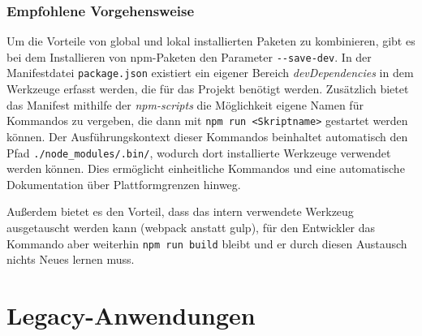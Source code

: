 \subsubsection{Empfohlene Vorgehensweise}
Um die Vorteile von global und lokal installierten Paketen zu kombinieren, gibt es bei dem Installieren von npm-Paketen den Parameter \verb|--save-dev|.
In der Manifestdatei \verb|package.json| existiert ein eigener Bereich \emph{devDependencies} in dem Werkzeuge erfasst werden, die für das Projekt benötigt werden.
Zusätzlich bietet das Manifest mithilfe der \emph{npm-scripts} die Möglichkeit eigene Namen für Kommandos zu vergeben, die dann mit \verb|npm run <Skriptname>| gestartet werden können.
Der Ausführungskontext dieser Kommandos beinhaltet automatisch den Pfad \verb|./node_modules/.bin/|, wodurch dort installierte Werkzeuge verwendet werden können.
Dies ermöglicht einheitliche Kommandos und eine automatische Dokumentation über Plattformgrenzen hinweg.

Außerdem bietet es den Vorteil, dass das intern verwendete Werkzeug ausgetauscht werden kann (\zB webpack anstatt gulp), für den Entwickler das Kommando aber weiterhin \verb|npm run build| bleibt und er durch diesen Austausch nichts Neues lernen muss.


\section{Legacy-Anwendungen}
\label{sec:legacy-applications}

